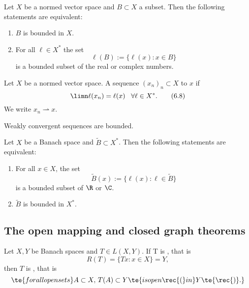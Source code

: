 \begin{cor}\label{vi.4}
    Let $X$ be a normed vector space and $B\subset X$ a subset. Then 
    the following statements are equivalent:
    \begin{enumerate}[label=\alph*)]
        \item \label{vi.4.a}$B$ is bounded \rec{(}in $X$\rec{)}.
        \item \label{vi.4.b}For all $\ell\in X^*$ the set 
        \[\ell(B):=\{\ell(x)\colon x\in B\}\]
        is a bounded subset of the real or complex numbers.
    \end{enumerate}
\end{cor}

\begin{definition}\label{vi.5}
    Let $X$ be a normed vector space. A sequence $(x_n)_n\subset X$  to $x$ if 
    \[\limn\ell(x_n)=\ell(x)\;\;\;\forall\ell\in X^*.\tag{6.8}\label{6.8}\]
    We write \(x_n \rightharpoonup x\).
\end{definition}

\begin{cor}\label{vi.6}
    Weakly convergent sequences are bounded.
\end{cor}

\begin{cor}\label{vi.7}
    Let $X$ be a Banach space and $\widetilde{B}\subset X^*$. Then the following statements 
    are equivalent:
    \begin{enumerate}[label=\alph*)]
        \item \label{vi.7.a}For all $x\in X$, the set
        \[\widetilde{B}(x):=\{\ell(x)\colon\ell\in\widetilde{B}\}\]
        is a bounded subset of $\R$ or $\C$.
        
        \item $\widetilde{B}$ is bounded \rec{(}in $X^*$\rec{)}.
    \end{enumerate}
\end{cor}

\subsection{The open mapping and closed graph theorems}
\begin{thm}\label{vi.8}
    Let $X,Y$ be Banach spaces and $T\in L(X,Y)$. If T is , that is
    \[R(T)=\{Tx\colon x\in X\}=Y,\]
    then $T$ is , that is
    \[\te{for all open sets }A\subset X,\, T(A)\subset Y\te{ is open \rec{(}in }Y\te{\rec{)}.}\]
\end{thm}

